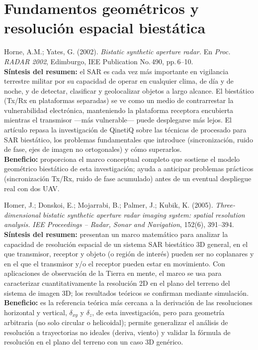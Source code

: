 \documentclass[11pt,a4paper]{report}
\begin{document}
\section{Fundamentos geométricos y resolución espacial biestática}
\label{sec:fundamentos}

\begin{enumerate}[label=\textbf{[A\arabic*]}, leftmargin=2.2cm, itemsep=10pt]

\item Horne, A.M.; Yates, G. (2002). \textit{Bistatic synthetic aperture
radar.} En \emph{Proc. RADAR 2002}, Edimburgo, IEE Publication No.\,490,
pp.\,6--10. \cite{horne2002}\\
\textbf{Síntesis del resumen:} el SAR es cada vez más importante en
vigilancia terrestre militar por su capacidad de operar en cualquier clima,
de día y de noche, y de detectar, clasificar y geolocalizar objetos a largo
alcance. El biestático (Tx/Rx en plataformas separadas) se ve como un medio
de contrarrestar la vulnerabilidad electrónica, manteniendo la plataforma
receptora encubierta mientras el transmisor ---más vulnerable--- puede
desplegarse más lejos. El artículo repasa la investigación de QinetiQ sobre
las técnicas de procesado para SAR biestático, los problemas fundamentales
que introduce (sincronización, ruido de fase, ejes de imagen no ortogonales)
y cómo superarlos.\\
\textbf{Beneficio:} proporciona el marco conceptual completo que sostiene el
modelo geométrico biestático de esta investigación; ayuda a anticipar
problemas prácticos (sincronización Tx/Rx, ruido de fase acumulado) antes de
un eventual despliegue real con dos UAV.

\item Homer, J.; Donskoi, E.; Mojarrabi, B.; Palmer, J.; Kubik, K. (2005).
\textit{Three-dimensional bistatic synthetic aperture radar imaging system:
spatial resolution analysis.} \emph{IEE Proceedings -- Radar, Sonar and
Navigation}, 152(6), 391--394. \cite{homer2005}\\
\textbf{Síntesis del resumen:} presentan un marco matemático para analizar
la capacidad de resolución espacial de un sistema SAR biestático 3D
general, en el que transmisor, receptor y objeto (o región de interés)
pueden ser no coplanares y en el que el transmisor y/o el receptor pueden
estar en movimiento. Con aplicaciones de observación de la Tierra en mente,
el marco se usa para caracterizar cuantitativamente la resolución 2D en el
plano del terreno del sistema de imagen 3D; los resultados teóricos se
confirman mediante simulación.\\
\textbf{Beneficio:} es la referencia teórica más cercana a la derivación de
las resoluciones horizontal y vertical, $\delta_{xy}$ y $\delta_z$, de esta
investigación, pero para geometría arbitraria (no solo circular o
helicoidal); permite generalizar el análisis de resolución a trayectorias no
ideales (deriva, viento) y validar la fórmula de resolución en el plano del
terreno con un caso 3D genérico.


\end{enumerate}
\end{document}
